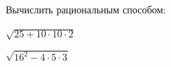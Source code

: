 \begin{homework}[number=1]
	\begin{listofex}
		\item Вычислить рациональным способом:
		\begin{enumcols}[itemcolumns=2]
			\item \( \sqrt{25+10\cdot10\cdot2} \)
			\item \( \sqrt{16^2-4\cdot5\cdot3} \)
		\end{enumcols}

\end{listofex}
\end{homework}
